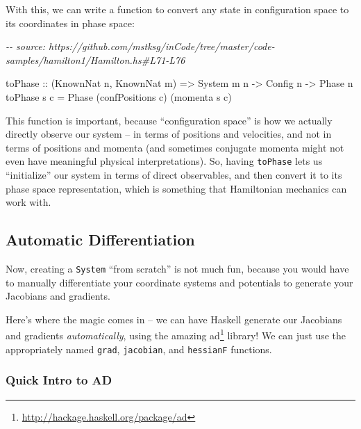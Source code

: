 \documentclass[]{article}
\newenvironment{Shaded}{}{}
\newcommand{\CommentTok}[1]{\textcolor[rgb]{0.38,0.63,0.69}{\textit{#1}}}
\newcommand{\DataTypeTok}[1]{\textcolor[rgb]{0.56,0.13,0.00}{#1}}
\newcommand{\NormalTok}[1]{#1}
\newcommand{\OtherTok}[1]{\textcolor[rgb]{0.00,0.44,0.13}{#1}}
\renewcommand{\href}[2]{#2\footnote{\url{#1}}}
\begin{document}
With this, we can write a function to convert any state in configuration space
to its coordinates in phase space:

\begin{Shaded}
\begin{Highlighting}[]
\CommentTok{{-}{-} source: https://github.com/mstksg/inCode/tree/master/code{-}samples/hamilton1/Hamilton.hs\#L71{-}L76}

\NormalTok{toPhase}
\OtherTok{    ::}\NormalTok{ (}\DataTypeTok{KnownNat}\NormalTok{ n, }\DataTypeTok{KnownNat}\NormalTok{ m)}
    \OtherTok{=>} \DataTypeTok{System}\NormalTok{ m n}
    \OtherTok{{-}>} \DataTypeTok{Config}\NormalTok{ n}
    \OtherTok{{-}>} \DataTypeTok{Phase}\NormalTok{ n}
\NormalTok{toPhase s c }\OtherTok{=} \DataTypeTok{Phase}\NormalTok{ (confPositions c) (momenta s c)}
\end{Highlighting}
\end{Shaded}

This function is important, because ``configuration space'' is how we actually
directly observe our system -- in terms of positions and velocities, and not in
terms of positions and momenta (and sometimes conjugate momenta might not even
have meaningful physical interpretations). So, having \texttt{toPhase} lets us
``initialize'' our system in terms of direct observables, and then convert it to
its phase space representation, which is something that Hamiltonian mechanics
can work with.

\hypertarget{automatic-differentiation}{%
\subsection{Automatic Differentiation}\label{automatic-differentiation}}

Now, creating a \texttt{System} ``from scratch'' is not much fun, because you
would have to manually differentiate your coordinate systems and potentials to
generate your Jacobians and gradients.

Here's where the magic comes in -- we can have Haskell generate our Jacobians
and gradients \emph{automatically}, using the amazing
\href{http://hackage.haskell.org/package/ad}{ad} library! We can just use the
appropriately named \texttt{grad}, \texttt{jacobian}, and \texttt{hessianF}
functions.

\hypertarget{quick-intro-to-ad}{%
\subsubsection{Quick Intro to AD}\label{quick-intro-to-ad}}
\end{document}
